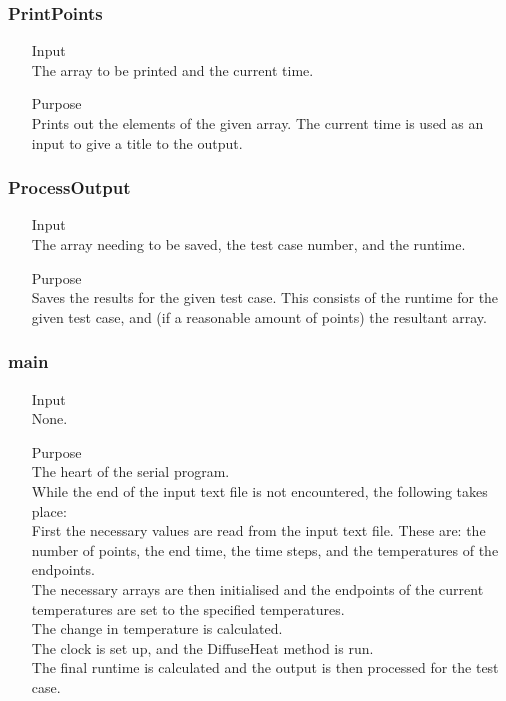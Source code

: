 \documentclass{article}
\begin{document}
\subsubsection{PrintPoints}
\begin{itemize}
	\item[Input] \hfill\\
	The array to be printed and the current time.
	\item[Purpose] \hfill\\
	Prints out the elements of the given array. The current time is used as an input to give a title to the output.
\end{itemize}

\subsubsection{ProcessOutput}
\begin{itemize}
	\item[Input] \hfill\\
	The array needing to be saved, the test case number, and the runtime.
	\item[Purpose] \hfill\\
	Saves the results for the given test case. This consists of the runtime for the given test case, and (if a reasonable amount of points) the resultant array.
\end{itemize}

\subsubsection{main}
\begin{itemize}
	\item[Input] \hfill\\
	None.
	\item[Purpose] \hfill\\
	The heart of the serial program.\\
	While the end of the input text file is not encountered, the following takes place:\\
	First the necessary values are read from the input text file. These are: the number of points, the end time, the time steps, and the temperatures of the endpoints.\\
	The necessary arrays are then initialised and the endpoints of the current temperatures are set to the specified temperatures.\\
	The change in temperature is calculated.\\
	The clock is set up, and the DiffuseHeat method is run.\\
	The final runtime is calculated and the output is then processed for the test case.
\end{itemize}
\end{document}
